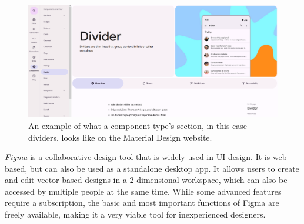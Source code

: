 \documentclass[11pt,titlepage,oneside,openany]{book}
\begin{document}
\begin{figure}[t]
	\centering
	\includegraphics[width=\textwidth]{figures/website.png}
	\caption{An example of what a component type's section, in this case dividers, looks like on the Material Design website.}
	\label{fig:website}
\end{figure}

\emph{Figma} \cite{noauthor_figma_nodate} is a collaborative design tool that is widely used in UI design. It is web-based, but can also be used as a standalone desktop app. It allows users to create and edit vector-based designs in a 2-dimensional workspace, which can also be accessed by multiple people at the same time. While some advanced features require a subscription, the basic and most important functions of Figma are freely available, making it a very viable tool for inexperienced designers. 
\end{document}
